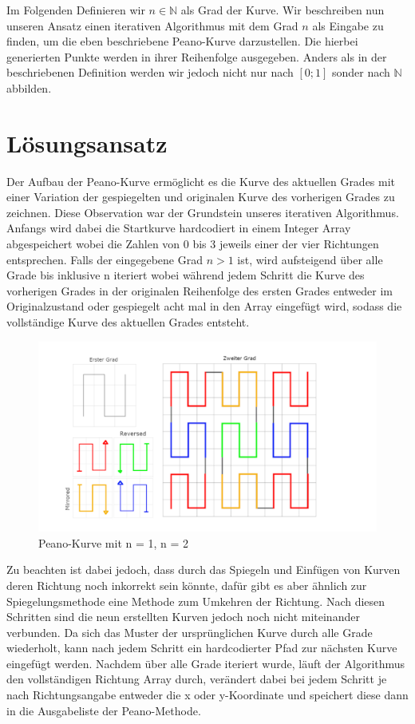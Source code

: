\documentclass[course=asp]{aspdoc}
\begin{document}
Im Folgenden Definieren wir $n \in \mathbb{N}$ als Grad der Kurve.
Wir beschreiben nun unseren Ansatz einen iterativen Algorithmus mit dem Grad $n$ als Eingabe zu finden, um die eben beschriebene Peano-Kurve darzustellen. Die hierbei generierten Punkte werden in ihrer Reihenfolge ausgegeben. Anders als in der beschriebenen Definition werden wir jedoch nicht nur nach $[0;1]$ sonder nach $\mathbb{N}$ abbilden.


\newpage

\section{Lösungsansatz}
Der Aufbau der Peano-Kurve ermöglicht es die Kurve des aktuellen Grades mit einer Variation der gespiegelten und originalen Kurve des vorherigen Grades zu zeichnen.
Diese Observation war der Grundstein unseres iterativen Algorithmus. Anfangs wird dabei die Startkurve hardcodiert in einem Integer Array abgespeichert wobei die Zahlen von 0 bis 3 jeweils einer der vier Richtungen entsprechen. Falls der eingegebene Grad $n>1$ ist, wird aufsteigend über alle Grade bis inklusive n iteriert wobei während jedem Schritt die Kurve des vorherigen Grades in der originalen Reihenfolge des ersten Grades entweder im Originalzustand oder gespiegelt acht mal in den Array eingefügt wird, sodass die vollständige Kurve des aktuellen Grades entsteht. 

\begin{figure}[ht]
\centering
\includegraphics{PeanoFarbcodiert.png}
\caption{Peano-Kurve mit n = 1, n = 2}\label{Abb:Peano Lösungsidee}
\end{figure}

Zu beachten ist dabei jedoch, dass durch das Spiegeln und Einfügen von Kurven deren Richtung noch inkorrekt sein könnte, dafür gibt es aber ähnlich zur Spiegelungsmethode eine Methode zum Umkehren der Richtung. Nach diesen Schritten sind die neun erstellten Kurven jedoch noch nicht miteinander verbunden. Da sich das Muster der ursprünglichen Kurve durch alle Grade wiederholt, kann nach jedem Schritt ein hardcodierter Pfad zur nächsten Kurve eingefügt werden.
Nachdem über alle Grade iteriert wurde, läuft der Algorithmus den vollständigen Richtung Array durch, verändert dabei bei jedem Schritt je nach Richtungsangabe entweder die x oder y-Koordinate und speichert diese dann in die Ausgabeliste der Peano-Methode.
\end{document}
